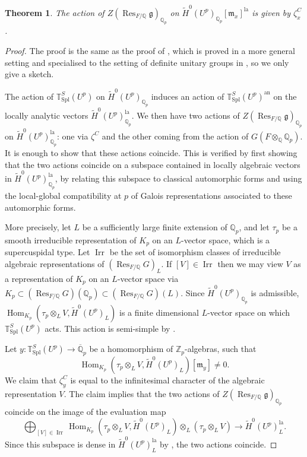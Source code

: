 \documentclass{amsart}
\newtheorem{thm}[prop]{Theorem}
\theoremstyle{definition}
\theoremstyle{remark}
\DeclareMathOperator{\Hom}{Hom}
\DeclareMathOperator{\Res}{Res}
\DeclareMathOperator{\Irr}{Irr}
\newcommand{\Qp}{\mathbb {Q}_p}
\newcommand{\Zp}{\ZZ_p}
\newcommand{\Qpbar}{\overline{\mathbb{Q}}_p}
\newcommand{\ZZ}{\mathbb Z}
\newcommand{\QQ}{\mathbb Q}
\newcommand{\mm}{\mathfrak m}
\newcommand{\ana}{\mathrm{an}}
\newcommand{\Htilde}{\widetilde{H}^0}
\newcommand{\Spl}{\mathrm{Spl}}
\newcommand{\la}{\mathrm{la}}
\begin{document}
\begin{thm}\label{Hecke} The action of $Z(\Res_{F/\QQ} \mathfrak g)_{\Qp}$ on $\Htilde(U^p)_{\Qp}[\mm_x]^{\la}$
is given by $\zeta^C_x$.
\end{thm} 
\begin{proof} The proof is the same as the proof of 
\cite[Theorem  9.20]{DPS}, which is proved in a more general setting and specialised to the setting of definite unitary groups in 
\cite[Section 9.9]{DPS}, so we only give a sketch. 

The action of 
$\mathbb T^S_{\mathrm{Spl}}(U^p)$ on $\Htilde(U^p)_{\Qp}$ induces an action of $\mathbb T^S_{\mathrm{Spl}}(U^p)^{\ana}$ on the locally analytic
vectors $\Htilde(U^p)_{\Qp}^{\la}$. We then 
have two actions of $Z(\Res_{F/\QQ} \mathfrak g)_{\Qp}$
on $\Htilde(U^p)_{\Qp}^{\la}$: one via $\zeta^C$ and the 
other coming from the action of $G(F\otimes_{\QQ} \Qp)$.
It is enough to show that these actions coincide. 
This is verified by first showing that the two actions 
coincide on a subspace contained in locally algebraic 
vectors in $\Htilde(U^p)_{\Qp}^{\la}$, by relating 
this subspace to classical automorphic forms and using 
the local-global compatibility at $p$ of Galois representations associated to these automorphic forms. 

More precisely, let $L$ be a sufficiently large finite extension of $\Qp$, and let $\tau_p$ be a smooth irreducible representation of $K_p$ on an $L$-vector space, which is a supercuspidal type. Let $\Irr$ be the
set of isomorphism classes of irreducible algebraic 
representations of $(\Res_{F/\QQ} G)_L$. 
If $[V]\in \Irr$ then 
we may view 
$V$ as a representation of $K_p$ 
on an $L$-vector space via 
$K_p\subset (\Res_{F/\QQ} G)(\Qp)\subset (\Res_{F/\QQ} G)(L)$. Since $\Htilde(U^p)_{\Qp}$ is admissible, 
$\Hom_{K_p}(\tau_p\otimes_L V, \Htilde(U^p)_{L})$
is a finite dimensional $L$-vector space on which $\mathbb T^S_{\Spl}(U^p)$ acts. This action is semi-simple by 
\cite[Lemma 9.18]{DPS}.

Let $y: \mathbb T^S_{\Spl}(U^p)\rightarrow \Qpbar$ be a homomorphism of $\Zp$-algebras, such that 
$$\Hom_{K_p}(\tau_p\otimes_L V, \Htilde(U^p)_{L})[\mm_y]\neq 0.$$ 
We claim that $\zeta^C_y$ is equal to the 
infinitesimal character of the algebraic representation $V$. The claim implies that 
the two actions of $Z(\Res_{F/\QQ} \mathfrak g)_{\Qp}$ coincide on the image of the 
evaluation map 
\begin{equation}
\bigoplus_{[V]\in \Irr} 
\Hom_{K_p}(\tau_p\otimes_L V, \Htilde(U^p)_{L})\otimes_L (\tau_p\otimes_L V) \rightarrow \Htilde(U^p)_{L}^{\la}.
\end{equation}
Since this subspace is dense in $\Htilde(U^p)_{L}^{\la}$ by \cite[Corollary 7.7]{DPS}, the two actions coincide.  


\end{proof}
\end{document}
